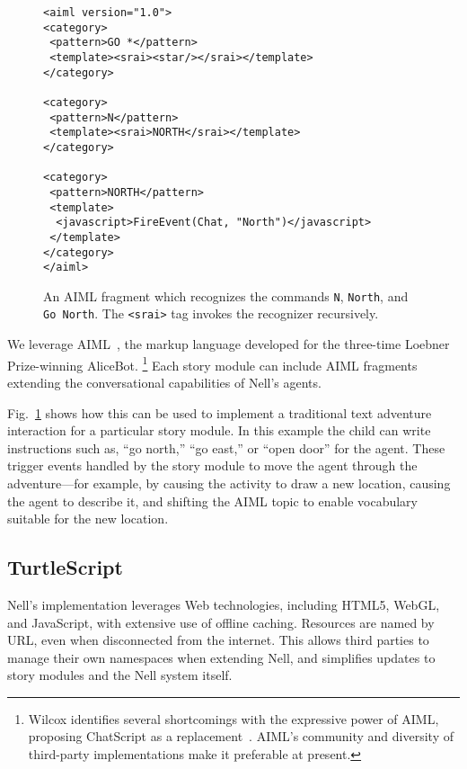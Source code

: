 \documentclass[preprint]{sig-alternate}
\begin{document}
\begin{figure}\small
\begin{verbatim}
<aiml version="1.0">
<category>
 <pattern>GO *</pattern>
 <template><srai><star/></srai></template>
</category>

<category>
 <pattern>N</pattern>
 <template><srai>NORTH</srai></template>
</category>

<category>
 <pattern>NORTH</pattern>
 <template>
  <javascript>FireEvent(Chat, "North")</javascript>
 </template>
</category>
</aiml>
\end{verbatim}
\caption{An AIML fragment which recognizes the commands \texttt{N},
  \texttt{North}, and \texttt{Go North}. The \texttt{<srai>} tag invokes the
  recognizer recursively.}\label{fig:aiml}
\end{figure}

We leverage AIML~\cite{aiml:2005},
the markup language developed for the three-time Loebner Prize-winning
AliceBot.%
\footnote{Wilcox identifies several shortcomings with the expressive
  power of AIML, proposing ChatScript as a
  replacement~\cite{wilcox:2010}.  AIML's community and
  diversity of third-party implementations make it preferable at present.}
Each story module can include AIML fragments extending the
conversational capabilities of Nell's agents.

Fig.~\ref{fig:aiml}
shows how this can be used to implement a traditional
text adventure interaction for a particular story module.
In this example the child can write instructions such as, ``go north,'' ``go
east,'' or ``open door'' for the agent.  These trigger events
handled by the story module to move the agent through the
adventure---for example, by causing the activity to draw a
new location, causing the agent to describe it, and shifting the
AIML topic to enable vocabulary suitable for the new location.


\subsection{TurtleScript}\label{sec:turtles}
Nell's implementation leverages Web technologies, including HTML5,
WebGL, and JavaScript, with extensive use of offline caching.
Resources are named by URL, even when disconnected from the
internet.  This allows third parties to manage their own namespaces
when extending Nell, and simplifies updates to story modules and
the Nell system itself.
\end{document}
